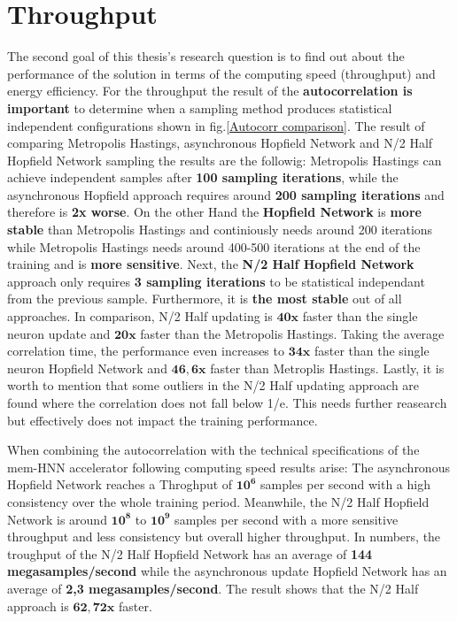 \section{Throughput}

The second goal of this thesis's research question is to find out about the performance of the solution in terms of the 
computing speed (throughput) and energy efficiency. 
For the throughput the result of the \textbf{autocorrelation is important} to determine when a sampling method produces statistical independent configurations shown in fig.\ref{Autocorr comparison}.
The result of comparing Metropolis Hastings, asynchronous Hopfield Network and N/2 Half Hopfield Network sampling the results are the followig:
Metropolis Hastings can achieve independent samples after \textbf{100 sampling iterations}, while the asynchronous Hopfield approach requires around \textbf{200 sampling iterations} and therefore 
is \textbf{2x worse}. On the other Hand the \textbf{Hopfield Network} is \textbf{more stable} than Metropolis Hastings and continiously needs around 200 iterations 
while Metropolis Hastings needs around 400-500 iterations at the end of the training and is \textbf{more sensitive}. 
Next, the \textbf{N/2 Half Hopfield Network} approach only requires \textbf{3 sampling iterations} to be statistical independant from the previous sample.
Furthermore, it is \textbf{the most stable} out of all approaches. In comparison, N/2 Half updating is \(\mathbf{40x}\) faster than the single neuron
update and \(\mathbf{20x}\) faster than the Metropolis Hastings. 
Taking the average correlation time, the performance even increases to \(\mathbf{34x}\) faster than the single neuron Hopfield Network and \(\mathbf{46,6x}\)
faster than Metroplis Hastings.
Lastly, it is worth to mention that some outliers in the N/2 Half updating approach are found where 
the correlation does not fall below 1/e. This needs further reasearch but effectively does not impact the training performance. 

When combining the autocorrelation with the technical specifications of the \ac{mem-HNN} accelerator following computing speed results arise:
The asynchronous Hopfield Network reaches a Throghput of \(\mathbf{10^6}\) samples per second with a high
consistency over the whole training period. 
Meanwhile, the N/2 Half Hopfield Network 
is around \(\mathbf{10^8}\) to \(\mathbf{10^9}\) samples per second with a more sensitive throughput and less consistency 
but overall higher throughput.
In numbers, the troughput of the N/2 Half Hopfield Network has an average of \textbf{144 megasamples/second} while the asynchronous update Hopfield Network has an average of \textbf{2,3 megasamples/second}.
The result shows that the N/2 Half approach is \(\mathbf{62,72x}\) faster. 

